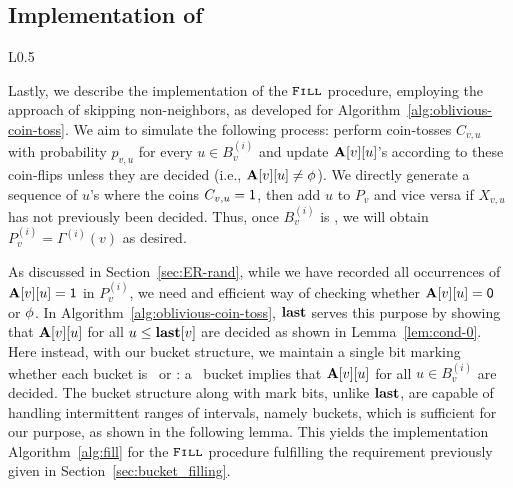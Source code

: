 \subsection{Implementation of }
\label{sec:fill_implement}

\begin{wrapfigure}[15]{L}{0.5\textwidth}
    \caption{Sampling in a Bucket}
    \label{alg:fill}
    \begin{algorithmic}
                \EndIf
            \EndWhile
    \EndProcedure
    \end{algorithmic}
\end{wrapfigure}

Lastly, we describe the implementation of the $\texttt{\textsc{Fill}}$ procedure, employing the approach of skipping non-neighbors, as developed for Algorithm~\ref{alg:oblivious-coin-toss}. We aim to simulate the following process: perform coin-tosses $C_{v,u}$ with probability $p_{v,u}$ for every $u \in B_v^{(i)}$ and update $\mathbf{A}[v][u]$'s according to these coin-flips unless they are decided (i.e., $\mathbf{A}[v][u] \neq \phi$). We directly generate a sequence of $u$'s where the coins $C_{v,u} = \mathsf{1}$, then add $u$ to $P_v$ and vice versa if $X_{v,u}$ has not previously been decided. Thus, once $B_v^{(i)}$ is \filled, we will obtain $P_v^{(i)} = \Gamma^{(i)}(v)$ as desired.

As discussed in Section~\ref{sec:ER-rand}, while we have recorded all occurrences of $\mathbf{A}[v][u]=\mathsf{1}$ in $P_v^{(i)}$, we need and efficient way of checking whether $\mathbf{A}[v][u] = \mathsf{0}$ or $\phi$. In Algorithm~\ref{alg:oblivious-coin-toss}, $\mathbf{last}$ serves this purpose by showing that $\mathbf{A}[v][u]$ for all $u \leq \mathbf{last}[v]$ are decided as shown in Lemma~\ref{lem:cond-0}. Here instead, with our bucket structure, we maintain a single bit marking whether each bucket is \filled~or \unfilled: a \filled~bucket implies that $\mathbf{A}[v][u]$ for all $u \in B_v^{(i)}$ are decided. The bucket structure along with mark bits, unlike $\mathbf{last}$, are capable of handling intermittent ranges of intervals, namely buckets, which is sufficient for our purpose, as shown in the following lemma. This yields the implementation Algorithm~\ref{alg:fill} for the $\texttt{\textsc{Fill}}$ procedure fulfilling the requirement previously given in Section~\ref{sec:bucket_filling}. 

